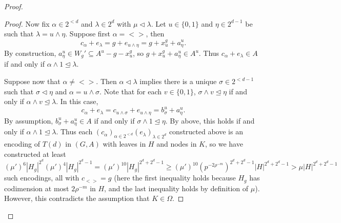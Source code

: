 \documentclass[12pt,oneside,british,a4wide]{amsart}
\numberwithin{equation}{section}
\theoremstyle{definition}
\begin{document}
\begin{proof}
\begin{proof}
Now fix $\alpha\in 2^{<d}$ and $\lambda\in 2^d$ with $\mu\triangleleft \lambda$.    Let $u\in \{0,1\}$ and  $\eta\in 2^{d-1}$ be such that $\lambda=u\wedge\eta$.  Suppose first $\alpha=<>$, then
$$
c_{\alpha}+e_{\lambda}=g+e_{u\wedge\eta}=g+x_u^g+a_{\eta}^u.
$$
By construction, $a_{\eta}^u\in W_g'\subseteq A^u-g-x^g_u$, so $g+x_u^g+a_{\eta}^u\in A^u$.  Thus $c_{\alpha}+e_{\lambda}\in A$ if and only if $\alpha\wedge 1\trianglelefteq \lambda$.

Suppose now that $\alpha\neq <>$.  Then $\alpha\triangleleft \lambda$ implies there is a unique $\sigma\in 2^{<d-1}$ such that $\sigma\triangleleft \eta$ and $\alpha=u\wedge\sigma$.  Note that for each $v\in \{0,1\}$, $\sigma\wedge v\trianglelefteq \eta$ if and only if $\alpha\wedge v\trianglelefteq \lambda$.   In this case,
$$
c_{\alpha}+e_{\lambda}=c_{u\wedge \sigma}+e_{u\wedge \eta}=b_{\sigma}^u+a_{\eta}^u.
$$
By assumption, $b_{\sigma}^u+a_{\eta}^u\in A$ if and only if $\sigma\wedge 1\trianglelefteq \eta$.  By above, this holds if and only if $\alpha\wedge 1\trianglelefteq \lambda$.  Thus each $(c_{\alpha})_{\alpha\in 2^{<d}}(e_{\lambda})_{\lambda\in 2^d}$ constructed above is an encoding of $T(d)$ in $(G,A)$ with leaves in $H$ and nodes in $K$, so we have constructed at least 
\[(\mu')^{6} |H_g|^{2^{d}}(\mu')^{4}|H_g|^{2^{d}-1}=(\mu')^{10}|H_g|^{2^d+2^d-1}\geq (\mu')^{10}(p^{-2\rho^{-m}})^{2^d+2^d-1}|H|^{2^d+2^d-1}>\mu|H|^{2^d+2^d-1}\]
such encodings, all with $c_{<>}=g$ (here the first inequality holds because $H_g$ has codimension at most $2\rho^{-m}$ in $H$, and the last inequality holds by definition of $\mu$).  However, this contradicts the assumption that $K\in \Omega$.
\end{proof}


\end{proof}
\end{document}
